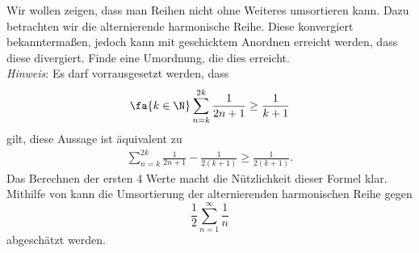 \begin{exercise}
  Wir wollen zeigen, dass man Reihen nicht ohne Weiteres umsortieren kann. Dazu
  betrachten wir die alternierende harmonische Reihe. Diese konvergiert
  bekanntermaßen, jedoch kann mit geschicktem Anordnen erreicht werden, dass
  diese divergiert. Finde eine Umordnung, die dies erreicht.\\
  \textit{Hinweis}: Es darf vorrausgesetzt werden, dass
  \[
    \fa{k \in \N} \sum_{n=k}^{2k} \frac{1}{2n+1} \geq \frac{1}{k+1}
  \]
  gilt, diese Aussage ist äquivalent zu
  \begin{align}
    \label{eq:harmonic-series}
    \sum_{n=k}^{2k} \frac{1}{2n+1} - \frac{1}{2(k+1)} \geq \frac{1}{2(k+1)}.
  \end{align}
  Das Berechnen der ersten 4 Werte macht die Nützlichkeit dieser Formel klar.
  Mithilfe von  kann die Umsortierung der
  alternierenden harmonischen Reihe gegen
  \[
    \frac{1}{2} \sum_{n=1}^\infty \frac{1}{n}
  \]
  abgeschätzt werden.
\end{exercise}
